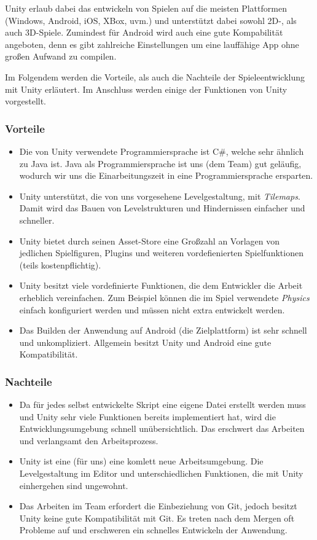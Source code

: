 Unity erlaub dabei das entwickeln von Spielen auf die meisten Plattformen (Windows, Android, iOS, XBox, uvm.) und unterstützt dabei sowohl 2D-, als auch 3D-Spiele. Zumindest für Android wird auch eine gute Kompabilität angeboten, denn es gibt zahlreiche Einstellungen um eine lauffähige App ohne großen Aufwand zu compilen. 

Im Folgendem werden die Vorteile, als auch die Nachteile der Spieleentwicklung mit Unity erläutert. Im Anschluss werden einige der Funktionen von Unity vorgestellt.
\subsubsection*{Vorteile}
\begin{itemize}
    \item Die von Unity verwendete Programmiersprache ist C\#, welche sehr ähnlich zu Java ist. Java als Programmiersprache ist uns (dem Team) gut geläufig, wodurch wir uns die Einarbeitungszeit in eine Programmiersprache ersparten.
    \item Unity unterstützt, die von uns vorgesehene Levelgestaltung, mit \textit{Tilemaps}. Damit wird das Bauen von Levelstrukturen und Hindernissen einfacher und schneller.
    \item Unity bietet durch seinen Asset-Store eine Großzahl an Vorlagen von jedlichen Spielfiguren, Plugins und weiteren vordefienierten Spielfunktionen (teils kostenpflichtig).
    \item Unity besitzt viele vordefinierte Funktionen, die dem Entwickler die Arbeit erheblich vereinfachen. Zum Beispiel können die im Spiel verwendete \textit{Physics} einfach konfiguriert werden und müssen nicht extra entwickelt werden.
    \item Das Builden der Anwendung auf Android (die Zielplattform) ist sehr schnell und unkompliziert. Allgemein besitzt Unity und Android eine gute Kompatibilität.
\end{itemize}

\subsubsection*{Nachteile}
\begin{itemize}
    \item Da für jedes selbst entwickelte Skript eine eigene Datei erstellt werden muss und Unity sehr viele Funktionen bereits implementiert hat, wird die Entwicklungsumgebung schnell unübersichtlich. Das erschwert das Arbeiten und verlangsamt den Arbeitsprozess.
    \item Unity ist eine (für uns) eine komlett neue Arbeitsumgebung. Die Levelgestaltung im Editor und unterschiedlichen Funktionen, die mit Unity einhergehen sind ungewohnt.
    \item Das Arbeiten im Team erfordert die Einbeziehung von Git, jedoch besitzt Unity keine gute Kompatibilität mit Git. Es treten nach dem Mergen oft Probleme auf und erschweren ein schnelles Entwickeln der Anwendung.
\end{itemize}

